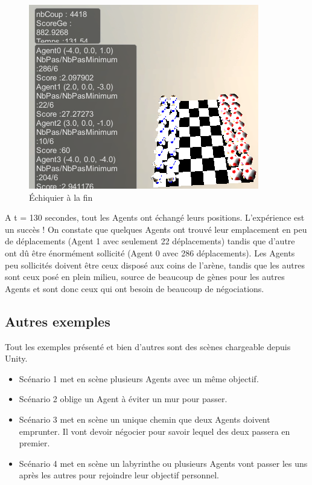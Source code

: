 \documentclass[11pt]{article}
\begin{document}
  
   \begin{figure}[H]
      \centering
      \includegraphics[scale=0.7]{Image/echequierBattleResolu.png} 
      \caption{\'Echiquier à la fin}
      \label{fig:échiquierBattleResolu}
  \end{figure}
  
  A t = 130 secondes, tout les Agents ont échangé leurs positions. L'expérience est un succès !
  On constate que quelques Agents ont trouvé leur emplacement en peu de déplacements (Agent 1 avec seulement 22 déplacements) tandis que d'autre ont dû être énormément sollicité (Agent 0 avec 286 déplacements).
  Les Agents peu sollicités doivent être ceux disposé aux coins de l'arène, tandis que les autres sont ceux posé en plein milieu, source de beaucoup de gènes pour les autres Agents et sont donc ceux qui ont besoin de beaucoup de négociations.
  
  \subsection{Autres exemples}
   Tout les exemples présenté et bien d'autres sont des scènes chargeable depuis Unity.
   \begin{itemize}
   \item Scénario 1 met en scène plusieurs Agents avec un même objectif. 
   \item Scénario 2 oblige un Agent à éviter un mur pour passer. 
   \item Scénario 3 met en scène un unique chemin que deux Agents doivent emprunter. 
   Il vont devoir négocier pour savoir lequel des deux passera en premier. 
   \item Scénario 4 met en scène un labyrinthe ou plusieurs Agents vont passer les uns après les autres pour rejoindre leur objectif personnel.
  \end{itemize}
  
\end{document}
